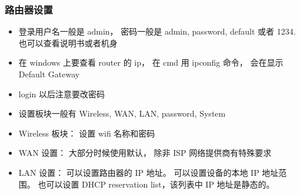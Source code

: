 \subsubsection{路由器设置}
\begin{itemize}
\item 登录用户名一般是 admin， 密码一般是 admin, password, default 或者 1234. 也可以查看说明书或者机身
\item 在 windows 上要查看 router 的 ip， 在 cmd 用 ipconfig 命令， 会在显示 Default Gateway
\item login 以后注意要改密码
\item 设置板块一般有 Wireless, WAN, LAN, password, System
\item Wireless 板块： 设置 wifi 名称和密码
\item WAN 设置： 大部分时候使用默认， 除非 ISP 网络提供商有特殊要求
\item LAN 设置： 可以设置路由器的 IP 地址。 可以设置设备的本地 IP 地址范围。 也可以设置 DHCP reservation list，该列表中 IP 地址是静态的。 
\end{itemize}
